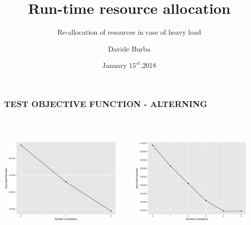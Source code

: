 \documentclass[10pt, compress]{beamer}
\title{Run-time resource allocation}
\subtitle{Re-allocation of resources in case of heavy load }
\date{January $15^{st}$,2018}
\author{Davide Burba}
\institute{Tutor: Prof. Danilo Ardagna}
\begin{document}
\maketitle

\begin{frame}[fragile]
  \frametitle{}

\end{frame}

\begin{frame}[fragile]
	\frametitle{TEST OBJECTIVE FUNCTION - ALTERNING}
	
	  \begin{columns}[onlytextwidth]
	  	\hspace{-8 mm}
	  	
	  	 \begin{column}{0.5\textwidth}
	  	\includegraphics[width=6cm,height=6cm]{images_ready/GFO_4_alt.png}

	  	 \end{column}
	  	 \hspace{5 mm}
	  	  \begin{column}{0.5\textwidth}
	  	  \includegraphics[width=6cm,height=6cm]{images_ready/GFO_8_alt.png}
	  	  	
	  	  \end{column}
	  \end{columns}
	
\end{frame}
\end{document}
